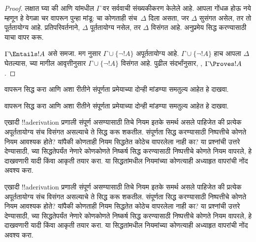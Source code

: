 \documentclass[../../../include/open-logic-section]{subfiles}
\begin{document}
\begin{proof}
लक्षात घ्या की  आणि
 यांमधील $\Gamma$ वर सर्ववाची संख्यकीकरण केलेले
आहे. आपला गोंधळ होऊ नये म्हणून  हे वेगळा चर
वापरून पुन्हा मांडू: चा कोणताही संच~$\Delta$ दिला असता,
जर $\Delta$ सुसंगत असेल, तर तो पूर्ततायोग्य आहे. प्रतिपरिवर्तनाने,
$\Delta$ पूर्ततायोग्य नसेल, तर $\Delta$ विसंगत आहे. अनुप्रमेय सिद्ध
करण्यासाठी याचा वापर करू.

$\Gamma \Entails !A$ असे समजा. मग 
नुसार $\Gamma \cup \{\lnot !A\}$ अपूर्ततायोग्य आहे. $\Gamma \cup
\{\lnot !A\}$ हाच आपला $\Delta$ घेतल्यास,
 च्या मागील आवृत्तीनुसार $\Gamma \cup
\{\lnot !A\}$ विसंगत आहे. पुढील संदर्भांनुसार,
,
$\Gamma \Proves !A$.
\end{proof}

\begin{prob}
 वापरून
 सिद्ध करा आणि अशा रीतीने
संपूर्णता प्रमेयाच्या दोन्ही मांडण्या समतुल्य आहेत हे दाखवा.
\end{prob}
\tagendprob

\begin{prob}
 वापरून
 सिद्ध करा आणि अशा रीतीने
संपूर्णता प्रमेयाच्या दोन्ही मांडण्या समतुल्य आहेत हे दाखवा.
\end{prob}
\tagendprob

\begin{prob}
एखादी !!a{derivation} प्रणाली संपूर्ण असण्यासाठी तिचे नियम इतके समर्थ
असले पाहिजेत की प्रत्येक अपूर्ततायोग्य संच विसंगत असल्याचे ते सिद्ध करू
शकतील. संपूर्णता सिद्ध करण्यासाठी निष्पत्तीचे कोणते नियम आवश्यक
होते? यांपैकी कोणताही नियम सिद्धतेत कोठेच वापरलेला नाही का? या प्रश्नांची
उत्तरे देण्यासाठी,  च्या सिद्धतेपर्यंत
नेणारे कोणकोणते निष्कर्ष सिद्ध करण्यासाठी निष्पत्तीचे कोणते नियम वापरले, हे
दाखवणारी यादी किंवा आकृती तयार करा. या सिद्धतांमधील नियमांच्या कोणत्याही
अध्याहृत वापरांची नोंद अवश्य करा.
\end{prob}
\tagendprob

\begin{prob}
एखादी !!a{derivation} प्रणाली संपूर्ण असण्यासाठी तिचे नियम इतके समर्थ
असले पाहिजेत की प्रत्येक अपूर्ततायोग्य संच विसंगत असल्याचे ते सिद्ध करू
शकतील. संपूर्णता सिद्ध करण्यासाठी निष्पत्तीचे कोणते नियम आवश्यक
होते? यांपैकी कोणताही नियम सिद्धतेत कोठेच वापरलेला नाही का? या प्रश्नांची
उत्तरे देण्यासाठी,  च्या सिद्धतेपर्यंत
नेणारे कोणकोणते निष्कर्ष सिद्ध करण्यासाठी निष्पत्तीचे कोणते नियम वापरले, हे
दाखवणारी यादी किंवा आकृती तयार करा. या सिद्धतांमधील नियमांच्या कोणत्याही
अध्याहृत वापरांची नोंद अवश्य करा.
\end{prob}
\tagendprob
\end{document}
